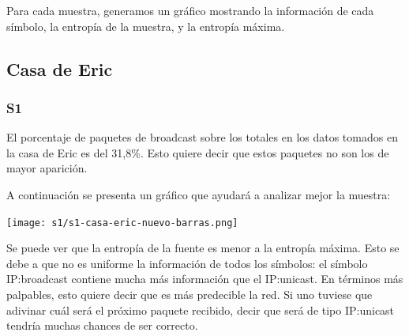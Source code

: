 

Para cada muestra, generamos un gráfico mostrando la información de cada símbolo,
la entropía de la muestra, y la entropía máxima.

\subsection{Casa de Eric}
\subsubsection{S1}
El porcentaje de paquetes de broadcast sobre los totales en los datos tomados en la 
casa de Eric es del 31,8\%. Esto quiere decir que estos paquetes no son los de 
mayor aparición. 

A continuación se presenta un gráfico que ayudará a analizar mejor
la muestra:

\begin{center}
\texttt{[image: s1/s1-casa-eric-nuevo-barras.png]}
\end{center}

Se puede ver que la entropía de la fuente es menor a la entropía máxima. Esto
se debe a que no es uniforme la información de todos los símbolos: el símbolo
IP:broadcast contiene mucha más información que el IP:unicast. En términos más
palpables, esto quiere decir que es más predecible la red. Si uno tuviese que
adivinar cuál será el próximo paquete recibido, decir que será de tipo
IP:unicast tendría muchas chances de ser correcto.

